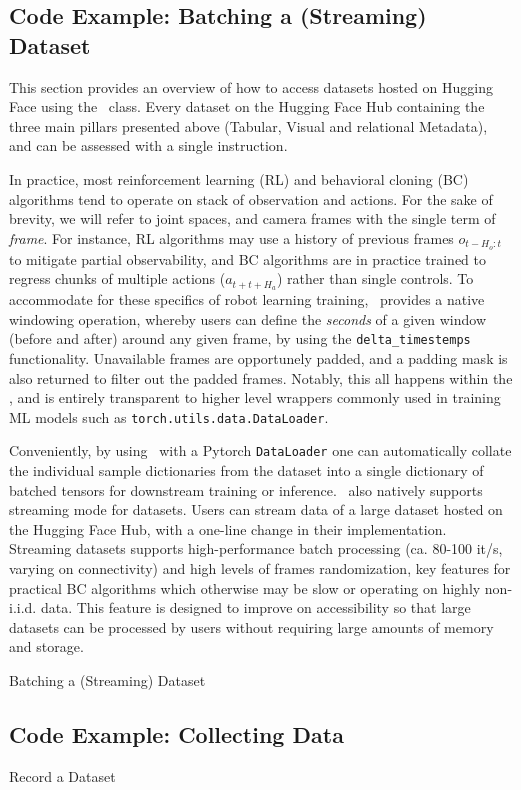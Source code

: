 \subsection{Code Example: Batching a (Streaming) Dataset}

This section provides an overview of how to access datasets hosted on Hugging Face using the \lerobotdataset~class.
Every dataset on the Hugging Face Hub containing the three main pillars presented above (Tabular, Visual and relational Metadata), and can be assessed with a single instruction.

In practice, most reinforcement learning (RL) and behavioral cloning (BC) algorithms tend to operate on stack of observation and actions.
For the sake of brevity, we will refer to joint spaces, and camera frames with the single term of \emph{frame}.
For instance, RL algorithms may use a history of previous frames \(o_{t-H_o:t} \) to mitigate partial observability, and BC algorithms are in practice trained to regress chunks of multiple actions (\(a_{t+t+H_a} \)) rather than single controls.
To accommodate for these specifics of robot learning training, \lerobotdataset~provides a native windowing operation, whereby users can define the \emph{seconds} of a given window (before and after) around any given frame, by using the \texttt{delta\_timestemps} functionality.
Unavailable frames are opportunely padded, and a padding mask is also returned to filter out the padded frames.
Notably, this all happens within the \lerobotdataset, and is entirely transparent to higher level wrappers commonly used in training ML models such as \texttt{torch.utils.data.DataLoader}.

Conveniently, by using \lerobotdataset~with a Pytorch \texttt{DataLoader} one can automatically collate the individual sample dictionaries from the dataset into a single dictionary of batched tensors for downstream training or inference.
\lerobotdataset~also natively supports streaming mode for datasets.
Users can stream data of a large dataset hosted on the Hugging Face Hub, with a one-line change in their implementation.
Streaming datasets supports high-performance batch processing (ca. 80-100 it/s, varying on connectivity) and high levels of frames randomization, key features for practical BC algorithms which otherwise may be slow or operating on highly non-i.i.d. data.
This feature is designed to improve on accessibility so that large datasets can be processed by users without requiring large amounts of memory and storage.

\begin{pbox}[label={ex:dataset-batching}]{Batching a (Streaming) Dataset}
    
\end{pbox}

\subsection{Code Example: Collecting Data}
\label{paragraph:collecting-data}

\begin{pbox}[label={ex:record-dataset}]{Record a Dataset}
    
\end{pbox}
